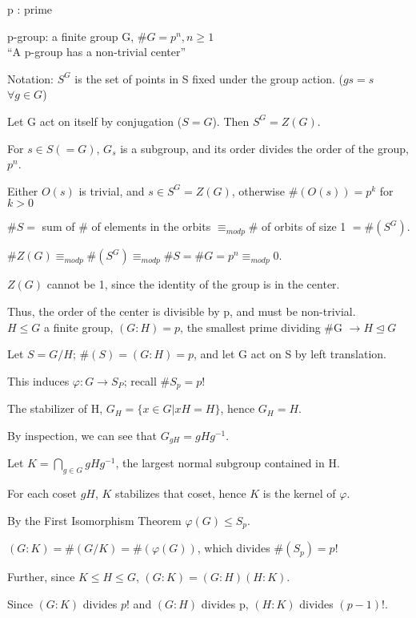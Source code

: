 \documentclass[12pt]{article}
\begin{document}
\noindent
p : prime

\noindent
p-group: a finite group G, $\#G = p^n, n \geq 1$\\

\noindent
``A p-group has a non-trivial center''

Notation: $S^G$ is the set of points in S fixed under the group action. ($gs = s$ $\forall g \in G$)

\noindent
Let G act on itself by conjugation ($S = G$).  Then $S^G = Z(G)$.

For $s \in S (= G)$, $G_s$ is a subgroup, and its order divides the order of the group, $p^n$.

Either $O(s)$ is trivial, and $s \in S^G = Z(G)$, otherwise $\#(O(s)) = p^k$ for $k > 0$

\noindent
$\#S =$ sum of \# of elements in the orbits $\equiv_{mod p} \#$ of orbits of size 1 $= \#(S^G)$.

$\#Z(G) \equiv_{mod p} \#(S^G) \equiv_{mod p} \#S = \#G = p^n \equiv_{mod p} 0$.

$Z(G)$ cannot be 1, since the identity of the group is in the center.

Thus, the order of the center is divisible by p, and must be non-trivial.\\

\noindent
$H \leq G$ a finite group, $(G : H) = p$, the smallest prime dividing \#G $\to H \trianglelefteq G$

Let $S = G\slash H$; $\#(S) = (G : H) = p$, and let G act on S by left translation.

This induces $\varphi: G \to S_P$; recall $\#S_p = p!$

The stabilizer of H, $G_H = \{x \in G | xH = H\}$, hence $G_H = H$.

By inspection, we can see that $G_{gH} = gHg^{-1}$.

Let $K = \bigcap_{g \in G}gHg^{-1}$, the largest normal subgroup contained in H.

For each coset $gH$, $K$ stabilizes that coset, hence $K$ is the kernel of $\varphi$.

By the First Isomorphism Theorem $\varphi(G) \leq S_p$.

$(G : K) = \#(G\slash K) = \#(\varphi(G))$, which divides $\#(S_p) = p!$

Further, since $K \leq H \leq G$, $(G : K) = (G : H)(H : K)$.

Since $(G : K)$ divides $p!$ and $(G : H)$ divides p, $(H : K)$ divides $(p - 1)!$.
\end{document}
